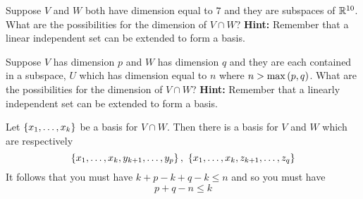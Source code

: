 \begin{enumialphparenastyle}
\begin{ex} Suppose $V$ and $W$ both have dimension equal to $7$ and they are
subspaces of $\mathbb{R}^{10}$. What are the possibilities for the dimension
of $V\cap W$? \textbf{Hint: }Remember that a linear independent set can be
extended to form a basis. \vspace{1mm}
\end{ex}

\begin{ex} Suppose $V$ has dimension $p$ and $W$ has dimension $q$ and they
are each contained in a subspace, $U$ which has dimension equal to $n$ where 
$n>\max \left(p,q\right)$. What are the possibilities for the dimension of 
$V\cap W$? \textbf{Hint: }Remember that a linearly independent set can be
extended to form a basis. \vspace{1mm}
\begin{sol}
Let $\left\{x_{1},\ldots,x_{k}\right\} $ be a
basis for $V\cap W$. Then there is a basis for $V$ and $W$ which are
respectively
\[
\set{x_{1},\ldots,x_{k},y_{k+1},\ldots,y_{p}} ,\ \set{
x_{1},\ldots,x_{k},z_{k+1},\ldots,z_{q}}
\]
It follows that you must have $k+p-k+q-k\leq n$ and so you must have
\[
p+q-n\leq k
\]
\end{sol}
\end{ex}


\end{enumialphparenastyle}
